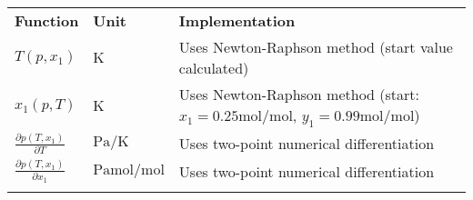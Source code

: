 %
\begin{longtable}[l]{l|l|p{7.5cm}}
	\toprule
	\addlinespace
	\textbf{Function} & \textbf{Unit} &	\textbf{Implementation} \\
	\addlinespace
	\midrule
	\endhead
	
	\bottomrule
	\endfoot
	\bottomrule
	\endlastfoot
	\addlinespace
	
	$T(p,x_1)$	& $\si{\kelvin}$ & Uses Newton-Raphson method (start value calculated) \\
	$x_1(p,T)$	& $\si{\kelvin}$ & Uses Newton-Raphson method (start: $x_1 = 0.25 \si{\mole\per\mole}$, $y_1 = 0.99 \si{\mole\per\mole}$) \\
	$\frac{\partial p(T,x_1)}{\partial T}$	& $\si{\pascal\per\kelvin}$ & Uses two-point numerical differentiation\\
	$\frac{\partial p(T,x_1)}{\partial x_1}$	& $\si{\pascal\mole\per\mole}$ & Uses two-point numerical differentiation\\
	
	\addlinespace
\end{longtable}
%
